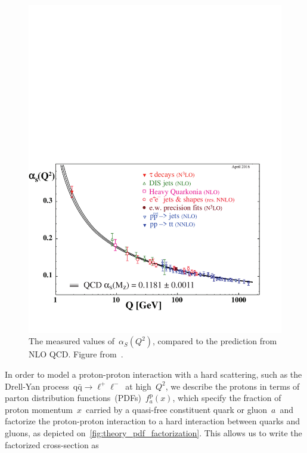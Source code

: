 \begin{figure}
\begin{centering}
\includegraphics[width=1.0\textwidth]{figures/theory/asq-2015.pdf}
\caption[The measured values of~$\alpha_S(Q^2)$ compared to NLO QCD]{The measured values of~$\alpha_S(Q^2)$, compared to the prediction from NLO QCD. Figure from~\cite{Patrignani:2016xqp}.}
\label{fig:theory_alphas_running}
\end{centering}
\end{figure}

In order to model a proton-proton interaction with a hard scattering, such as the Drell-Yan process~$\mathrm{q} \bar{\mathrm{q}} \rightarrow \ell^+ \ell^-$~at high~$Q^2$, we describe the protons in terms of parton distribution functions~(PDFs)~$f_a^{\mathrm{p}}(x)$, which specify the fraction of proton momentum~$x$~carried by a quasi-free constituent quark or gluon~$a$~and factorize the proton-proton interaction to a hard interaction between quarks and gluons, as depicted on~\cref{fig:theory_pdf_factorization}. This allows us to write the factorized cross-section as


